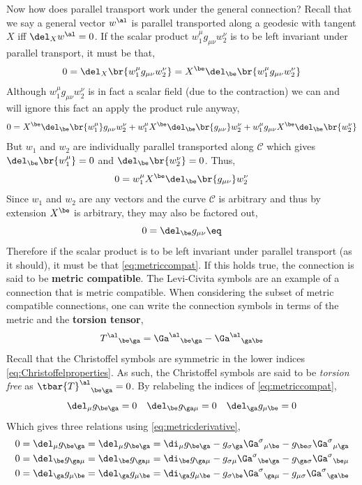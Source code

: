 \documentclass{article}
\begin{document}
Now how does parallel transport work under the general connection? Recall that we say a general vector $w^\al$ is parallel transported along a geodesic with tangent $X$ iff $\del_X w^\al = 0$.
If the scalar product $w_1^\mu g_{\mu\nu} w_2^\nu$ is to be left invariant under parallel transport, it must be that,
\[ 0 = \del_X \br{w_1^\mu g_{\mu\nu} w_2^\nu} = X^\be \del_\be\br{w_1^\mu g_{\mu\nu} w_2^\nu}  \]
Although $w_1^\mu g_{\mu\nu} w_2^\nu$ is in fact a scalar field (due to the contraction) we can and will ignore this fact an apply the product rule anyway,
\[ 0 = X^\be \del_\be\br{w_1^\mu} g_{\mu\nu} w_2^\nu + w_1^\mu X^\be \del_\be\br{g_{\mu\nu}} w_2^\nu + w_1^\mu g_{\mu\nu} X^\be \del_\be\br{w_2^\nu} \]
But $w_1$ and $w_2$ are individually parallel transported along $\mathcal{C}$ which gives $\del_\be\br{w_1^\mu} = 0$ and $\del_\be\br{w_2^\nu} = 0$. Thus,
\[ 0 = w_1^\mu X^\be \del_\be\br{g_{\mu\nu}} w_2^\nu \]
Since $w_1$ and $w_2$ are any vectors and the curve $\mathcal{C}$ is arbitrary and thus by extension $X^\be$ is arbitrary, they may also be factored out,
\[ 0 = \del_\be g_{\mu\nu} \eq \label{eq:metriccompat} \]
Therefore if the scalar product is to be left invariant under parallel transport (as it should), it must be that \eqref{eq:metriccompat}. If this holds true, the connection is said to be \textbf{metric compatible}. The Levi-Civita symbols are an example of a connection that is metric compatible.
When considering the subset of metric compatible connections, one can write the connection symbols in terms of the metric and the \textbf{torsion tensor},
\[ {T^\al}_{\be\ga} = {\Ga^\al}_{\be\ga} - {\Ga^\al}_{\ga\be} \]
Recall that the Christoffel symbols are symmetric in the lower indices \eqref{eq:Christoffelproperties}. As such, the Christoffel symbols are said to be \textit{torsion free} as ${\tbar{T}^\al}_{\be\ga} = 0$. By relabeling the indices of \eqref{eq:metriccompat},
\[ \del_\mu g_{\be\ga} = 0 \quad \del_\be g_{\ga\mu} = 0 \quad \del_\ga g_{\mu\be} = 0 \]
Which gives three relations using \eqref{eq:metricderivative},
\begin{align*}
0 &= \del_\mu g_{\be\ga} = \del_\mu g_{\be\ga} = \di_\mu g_{\be\ga} - g_{\sigma\ga} {\Ga^\sigma}_{\mu\be}  - g_{\be\sigma}  {\Ga^\sigma}_{\mu\ga} \\
0 &= \del_\be g_{\ga\mu} = \del_\be g_{\ga\mu} = \di_\be g_{\ga\mu} - g_{\sigma\mu} {\Ga^\sigma}_{\be\ga}  - g_{\ga\sigma}  {\Ga^\sigma}_{\be\mu} \\
0 &= \del_\ga g_{\mu\be} = \del_\ga g_{\mu\be} = \di_\ga g_{\mu\be} - g_{\sigma\be} {\Ga^\sigma}_{\ga\mu}  - g_{\mu\sigma}  {\Ga^\sigma}_{\ga\be}
\end{align*}
\end{document}
